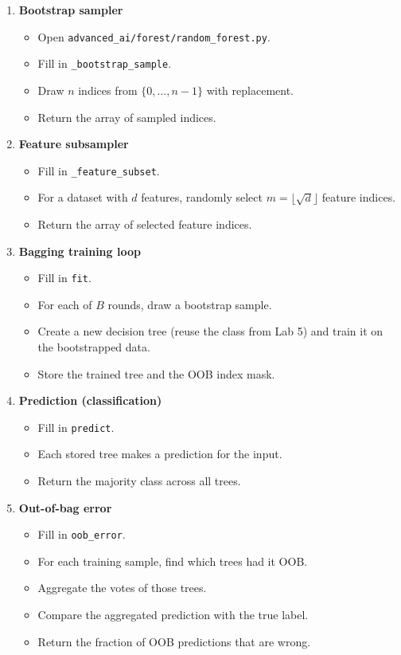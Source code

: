 \begin{enumerate}[label=\textbf{T\arabic*.}]
  \item \textbf{Bootstrap sampler}
\begin{itemize}
  \item Open \texttt{advanced\_ai/forest/random\_forest.py}.
  \item Fill in \texttt{\_bootstrap\_sample}.
  \item Draw $n$ indices from $\{0,\dots,n-1\}$ with replacement.
  \item Return the array of sampled indices.
\end{itemize}

  \item \textbf{Feature subsampler}
\begin{itemize}
  \item Fill in \texttt{\_feature\_subset}.
  \item For a dataset with $d$ features, randomly select $m = \lfloor\sqrt{d}\rfloor$ feature indices.
  \item Return the array of selected feature indices.
\end{itemize}

  \item \textbf{Bagging training loop}
\begin{itemize}
  \item Fill in \texttt{fit}.
  \item For each of $B$ rounds, draw a bootstrap sample.
  \item Create a new decision tree (reuse the class from Lab 5) and train it on the bootstrapped data.
  \item Store the trained tree and the OOB index mask.
\end{itemize}

  \item \textbf{Prediction (classification)}
\begin{itemize}
  \item Fill in \texttt{predict}.
  \item Each stored tree makes a prediction for the input.
  \item Return the majority class across all trees.
\end{itemize}

  \item \textbf{Out-of-bag error}
\begin{itemize}
  \item Fill in \texttt{oob\_error}.
  \item For each training sample, find which trees had it OOB.
  \item Aggregate the votes of those trees.
  \item Compare the aggregated prediction with the true label.
  \item Return the fraction of OOB predictions that are wrong.
\end{itemize}


\end{enumerate}
